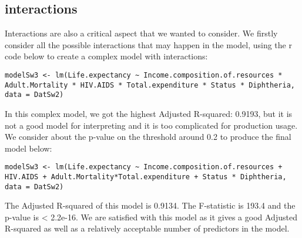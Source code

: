 \subsection{interactions}

Interactions are also a critical aspect that we wanted to consider. We firstly consider all the possible interactions that may happen in the model, using the r code below to create a complex model with interactions:

\begin{verbatim}
modelSw3 <- lm(Life.expectancy ~ Income.composition.of.resources * Adult.Mortality * HIV.AIDS * Total.expenditure * Status * Diphtheria, data = DatSw2)
\end{verbatim}
In this complex model, we got the highest Adjusted R-squared: 0.9193, but it is not a good model for interpreting and it is too complicated for production usage. We consider about the p-value on the threshold around 0.2 to produce the final model below:

\begin{verbatim}
modelSw3 <- lm(Life.expectancy ~ Income.composition.of.resources + HIV.AIDS + Adult.Mortality*Total.expenditure + Status * Diphtheria, data = DatSw2)
\end{verbatim}
The Adjusted R-squared of this model is 0.9134. The F-statistic is 193.4 and the p-value is < 2.2e-16. We are satisfied with this model as it gives a good Adjusted R-squared as well as a relatively acceptable number of predictors in the model.

